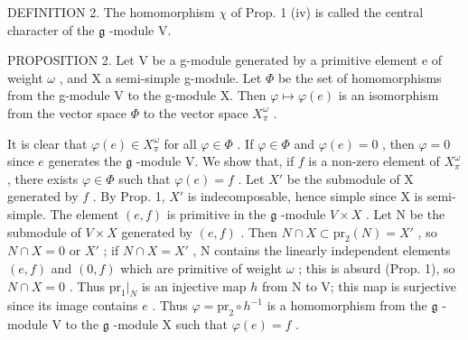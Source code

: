 DEFINITION 2. The homomorphism \(\chi\) of Prop. 1 (iv) is called the central character of the \(\mathfrak{g}\) -module V.

PROPOSITION 2. Let V be a g-module generated by a primitive element e of weight \(\omega\) , and X a semi-simple g-module. Let \(\Phi\) be the set of homomorphisms from the g-module V to the g-module X. Then \(\varphi\mapsto\varphi(e)\) is an isomorphism from the vector space \(\Phi\) to the vector space \(X_{\pi}^{\omega}\) .

It is clear that \(\varphi(e) \in X_{\pi}^{\omega}\) for all \(\varphi \in \Phi\) . If \(\varphi \in \Phi\) and \(\varphi(e) = 0\) , then \(\varphi = 0\) since \(e\) generates the \(\mathfrak{g}\) -module V. We show that, if \(f\) is a non-zero element of \(X_{\pi}^{\omega}\) , there exists \(\varphi \in \Phi\) such that \(\varphi(e) = f\) . Let \(X'\) be the submodule of X generated by \(f\) . By Prop. 1, \(X'\) is indecomposable, hence simple since X is semi-simple. The element \((e, f)\) is primitive in the \(\mathfrak{g}\) -module \(V \times X\) . Let N be the submodule of \(V \times X\) generated by \((e, f)\) . Then \(N \cap X \subset \mathrm{pr}_2(N) = X'\) , so \(N \cap X = 0\) or \(X'\) ; if \(N \cap X = X'\) , N contains the linearly independent elements \((e, f)\) and \((0, f)\) which are primitive of weight \(\omega\) ; this is absurd (Prop. 1), so \(N \cap X = 0\) . Thus \(\mathrm{pr}_1|_{N}\) is an injective map \(h\) from N to V; this map is surjective since its image contains \(e\) . Thus \(\varphi = \mathrm{pr}_2 \circ h^{-1}\) is a homomorphism from the \(\mathfrak{g}\) -module V to the \(\mathfrak{g}\) -module X such that \(\varphi(e) = f\) .

